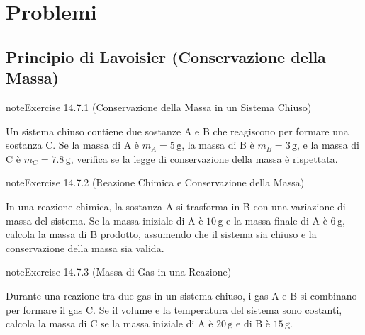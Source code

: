 \documentclass[letterpaper,10pt,italian]{jupyterBook}
\begin{document}
\sphinxstepscope


\section{Problemi}
\label{\detokenize{ch/thermodynamics/principles-problems:problemi}}\label{\detokenize{ch/thermodynamics/principles-problems:physics-hs-thermodynamics-principles-problems}}\label{\detokenize{ch/thermodynamics/principles-problems::doc}}

\subsection{Principio di Lavoisier (Conservazione della Massa)}
\label{\detokenize{ch/thermodynamics/principles-problems:principio-di-lavoisier-conservazione-della-massa}} \label{exercise:ch/thermodynamics/principles-problems-exercise-0}

\begin{sphinxadmonition}{note}{Exercise 14.7.1 (Conservazione della Massa in un Sistema Chiuso)}



\sphinxAtStartPar
Un sistema chiuso contiene due sostanze A e B che reagiscono per formare una sostanza C. Se la massa di A è \(m_A = 5 \, \text{g}\), la massa di B è \(m_B = 3 \, \text{g}\), e la massa di C è \(m_C = 7.8 \, \text{g}\), verifica se la legge di conservazione della massa è rispettata.
\end{sphinxadmonition}
 \label{exercise:ch/thermodynamics/principles-problems-exercise-1}

\begin{sphinxadmonition}{note}{Exercise 14.7.2 (Reazione Chimica e Conservazione della Massa)}



\sphinxAtStartPar
In una reazione chimica, la sostanza A si trasforma in B con una variazione di massa del sistema. Se la massa iniziale di A è \(10 \, \text{g}\) e la massa finale di A è \(6 \, \text{g}\), calcola la massa di B prodotto, assumendo che il sistema sia chiuso e la conservazione della massa sia valida.
\end{sphinxadmonition}
 \label{exercise:ch/thermodynamics/principles-problems-exercise-2}

\begin{sphinxadmonition}{note}{Exercise 14.7.3 (Massa di Gas in una Reazione)}



\sphinxAtStartPar
Durante una reazione tra due gas in un sistema chiuso, i gas A e B si combinano per formare il gas C. Se il volume e la temperatura del sistema sono costanti, calcola la massa di C se la massa iniziale di A è \(20 \, \text{g}\) e di B è \(15 \, \text{g}\).
\end{sphinxadmonition}
 \label{exercise:ch/thermodynamics/principles-problems-exercise-3}
\end{document}
